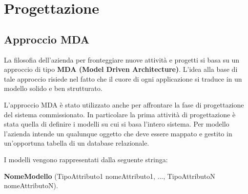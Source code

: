 \chapter{Progettazione}
\label{cap:progettazione}


\setlength{\parskip}{3ex}

\section{Approccio MDA}
La filosofia dell'azienda per fronteggiare nuove attività e progetti si basa su un approccio di tipo \textbf{MDA (Model Driven Architecture)}. L'idea alla base di tale approccio risiede nel fatto che il cuore di ogni applicazione si traduce in un modello solido e ben strutturato. 

\setlength{\parskip}{3ex}

\noindent L'approccio MDA è stato utilizzato anche per affrontare la fase di progettazione del sistema commissionato. In particolare la prima attività di progettazione è stata quella di definire i modelli su cui si basa l'intero sistema. Per modello l'azienda intende un qualunque oggetto che deve essere mappato e gestito in un'opportuna tabella di un database relazionale.   

\setlength{\parskip}{3ex}

\noindent I modelli vengono rappresentati dalla seguente stringa:

\setlength{\parskip}{2ex}

\noindent \textbf{NomeModello} (TipoAttributo1 nomeAttributo1, ..., TipoAttributoN nomeAttributoN).

\pagebreak

